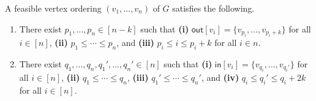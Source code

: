 \documentclass[english]{lipics-v2021}
\begin{document}
\begin{observation} \label{obs-vertex}
    A feasible vertex ordering $(v_1,\dots,v_n)$ of $G$ satisfies the following.
    \begin{enumerate}
        \item There exist $p_1,\dots,p_n \in [n-k]$ such that \textnormal{\bf (i)} $\mathsf{out}[v_i] = \{v_{p_i},\dots,v_{p_i+k}\}$ for all $i \in [n]$, \textnormal{\bf (ii)} $p_1 \leq \cdots \leq p_n$, and \textnormal{\bf (iii)} $p_i \leq i \leq p_i+k$ for all $i \in n$.
        \item There exist $q_1,\dots,q_n,q_1',\dots,q_n' \in [n]$ such that \textnormal{\bf (i)} $\mathsf{in}[v_i] = \{v_{q_i},\dots,v_{q_i'}\}$ for all $i \in [n]$, \textnormal{\bf (ii)} $q_1 \leq \cdots \leq q_n$, \textnormal{\bf (iii)} $q_1' \leq \cdots \leq q_n'$, and \textnormal{\bf (iv)} $q_i \leq q_i' \leq q_i+2k$ for all $i \in [n]$.
    \end{enumerate}
\end{observation}
\end{document}
